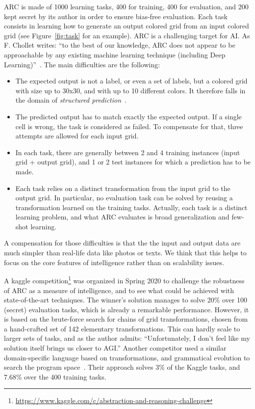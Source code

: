 \documentclass[a4paper]{llncs}
\begin{document}
ARC is made of 1000 learning tasks, 400 for training, 400 for
evaluation, and 200 kept secret by its author in order to ensure
bias-free evaluation. Each task consists in learning how to generate
an output colored grid from an input colored grid (see
Figure~\ref{fig:task} for an example).
%
ARC is a challenging target for AI. As F. Chollet writes: ``to the
best of our knowledge, ARC does not appear to be approachable by any
existing machine learning technique (including Deep
Learning)''~\cite{Chollet2019}. The main difficulties are the
following:
\begin{itemize}
\item The expected output is not a label, or even a set of labels, but
  a colored grid with size up to 30x30, and with up to 10 different
  colors. It therefore falls in the domain of {\em structured
    prediction}~\cite{dietterich2008structured}.
\item The predicted output has to match exactly the expected
  output. If a single cell is wrong, the task is considered as
  failed. To compensate for that, three attempts are allowed for each
  input grid.
\item In each task, there are generally between 2 and 4 training
  instances (input grid + output grid), and 1 or 2 test instances for
  which a prediction has to be made.
\item Each task relies on a distinct transformation from the input
  grid to the output grid. In particular, no evaluation task can be
  solved by reusing a transformation learned on the training
  tasks. Actually, each task is a distinct learning problem, and what
  ARC evaluates is broad generalization and few-shot learning.
\end{itemize}
A compensation for those difficulties is that the the input and output
data are much simpler than real-life data like photos or texts. We
think that this helps to focus on the core features of intelligence
rather than on scalability issues.

A kaggle
competition\footnote{\url{https://www.kaggle.com/c/abstraction-and-reasoning-challenge}}
was organized in Spring 2020 to challenge the robustness of ARC as a
measure of intelligence, and to see what could be achieved with
state-of-the-art techniques. The winner's solution manages to solve
20\% over 100 (secret) evaluation tasks, which is already a remarkable
performance. However, it is based on the brute-force search for chains
of grid transformations, chosen from a hand-crafted set of 142
elementary transformations. This can hardly scale to larger sets of
tasks, and as the author admits: ``Unfortunately, I don't feel like my
solution itself brings us closer to AGI.'' Another competitor used a
similar domain-specific language based on transformations, and
grammatical evolution to search the program
space~\cite{Fischer2020}. Their approach solves 3\% of the Kaggle
tasks, and 7.68\% over the 400 training tasks.
\end{document}
